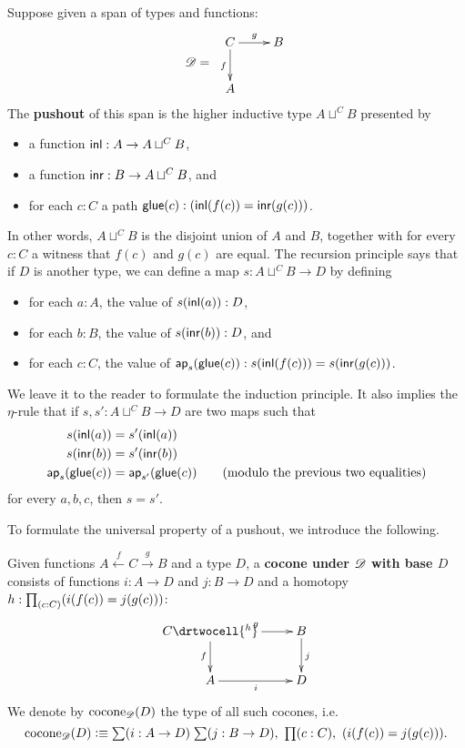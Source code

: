 Suppose given a span of types and functions:
\[\Ddiag=\;\vcenter{\xymatrix{C \ar^g[r] \ar_f[d] & B \\ A & }}\]
The \textbf{pushout} of this span is the higher inductive type $A\sqcup^CB$ presented by
\begin{itemize}
\item a function $\mathsf{inl}:A\to A\sqcup^CB$,
\item a function $\mathsf{inr}:B \to A\sqcup^CB$, and
\item for each $c:C$ a path $\mathsf{glue}(c):(\mathsf{inl}(f(c))=\mathsf{inr}(g(c)))$.
\end{itemize}
In other words, $A\sqcup^CB$ is the disjoint union of $A$ and $B$, together with for every $c:C$ a witness that $f(c)$ and $g(c)$ are equal.
The recursion principle says that if $D$ is another type, we can define a map $s:A\sqcup^CB\to{}D$ by defining
\begin{itemize}
\item for each $a:A$, the value of $s(\mathsf{inl}(a)):D$,
\item for each $b:B$, the value of $s(\mathsf{inr}(b)):D$, and
\item for each $c:C$, the value of $\mathsf{ap}_{s}(\mathsf{glue}(c)):s(\mathsf{inl}(f(c)))=s(\mathsf{inr}(g(c)))$.
\end{itemize}
We leave it to the reader to formulate the induction principle.
It also implies the $\eta$-rule that if $s,s':A\sqcup^CB\to{}D$ are two maps such that
\begin{align*}
  s(\mathsf{inl}(a))&=s'(\mathsf{inl}(a))\\
  s(\mathsf{inr}(b))&=s'(\mathsf{inr}(b))\\
  \mathsf{ap}_{s}(\mathsf{glue}(c))&=\mathsf{ap}_{s'}(\mathsf{glue}(c))
  \qquad\text{(modulo the previous two equalities)}
\end{align*}
for every $a,b,c$, then $s=s'$.

To formulate the universal property of a pushout, we introduce the following.

\begin{defn}
  Given functions $A \xleftarrow{f} C \xrightarrow{g} B$ and a type $D$, a \textbf{cocone under $\mathscr{D}$ with base $D$} consists of functions $i:A\to{}D$ and $j:B\to{}D$ and a homotopy $h : \prd{c:C} (i(f(c))=j(g(c)))$:
  \[\uppercurveobject{{ }}\lowercurveobject{{ }}\twocellhead{{ }}
  \xymatrix{C \ar^g[r] \ar_f[d] \drtwocell{^h} & B \ar^j[d] \\ A \ar_i[r] & D
  }\]
  We denote by $\mathrm{cocone}_{\mathscr{D}}(D)$ the type of all such cocones, i.e.
  \[ \cocone{\Ddiag}{D} \defeq
  \sm{i:A\to D}{j:B\to D} \prd{c:C} (i(f(c))=j(g(c))).
  \]
\end{defn}


